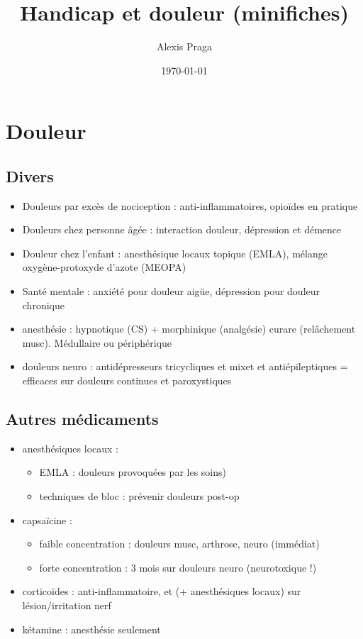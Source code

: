 \documentclass[11pt]{article}
\author{Alexis Praga}
\date{\today}
\title{Handicap et douleur (minifiches)}
\begin{document}
\maketitle
\tableofcontents



\section{Douleur}
\label{sec:orgdd7fdef}
\subsection{Divers}
\label{sec:org1d76c11}
\begin{itemize}
\item Douleurs par excès de nociception : anti-inflammatoires, opioïdes en pratique
\item Douleurs chez personne âgée : interaction douleur, dépression et démence
\item Douleur chez l'enfant : anesthésique locaux topique (EMLA), mélange
oxygène-protoxyde d'azote (MEOPA)
\item Santé mentale : anxiété pour douleur aigüe, dépression pour douleur chronique
\item anesthésie : hypnotique (CS) + morphinique (analgésie) \textpm{} curare (relâchement
musc). Médullaire ou périphérique
\item douleurs neuro : antidépresseurs tricycliques et mixet et antiépileptiques =
efficaces sur douleurs continues et paroxystiques
\end{itemize}

\subsection{Autres médicaments}
\label{sec:org623bb9a}
\begin{itemize}
\item anesthésiques locaux : 
\begin{itemize}
\item EMLA : douleurs provoquées par les soins)
\item techniques de bloc : prévenir douleurs post-op
\end{itemize}
\item capsaïcine : 
\begin{itemize}
\item faible concentration : douleurs musc, arthrose, neuro (immédiat)
\item forte concentration : 3 mois sur douleurs neuro (neurotoxique !)
\end{itemize}
\item corticoïdes : anti-inflammatoire, et (+ anesthésiques locaux) sur
lésion/irritation nerf
\item kétamine : anesthésie seulement
\end{itemize}
\end{document}
